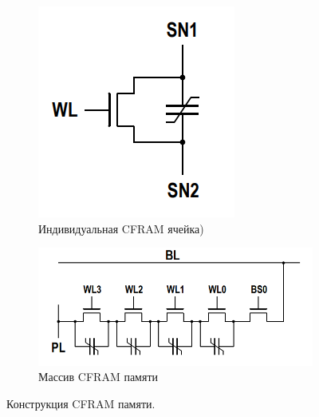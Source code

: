\documentclass[a4paper,12pt]{article} %
\begin{document}
\begin{figure}
  \begin{subfigure}[b]{0.3\textwidth}
    \includegraphics[width=\textwidth]{CFRAM_cell.png}
    \caption{Индивидуальная CFRAM ячейка)}
    \label{pic:CFRAM_cell}
  \end{subfigure}
  \begin{subfigure}[b]{0.7\textwidth}
    \includegraphics[width=\textwidth]{CFRAM.png}
    \caption{Массив CFRAM памяти}
    \label{pic:CFRAM}
  \end{subfigure}
  \caption{Конструкция CFRAM памяти.}
\end{figure}
\end{document}
